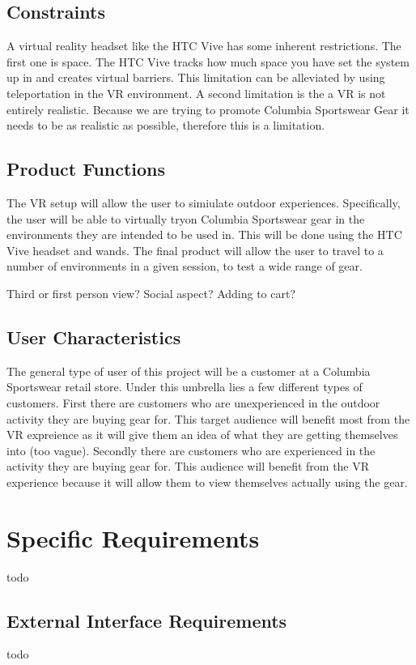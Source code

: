 \documentclass[10pt, oneside,onecolumn,draftclsnofoot]{IEEEtran}
\begin{document}
\subsection{Constraints}
A virtual reality headset like the HTC Vive has some inherent restrictions.
The first one is space. The HTC Vive tracks how much space you have set the
system up in and creates virtual barriers. This limitation can be alleviated by
using teleportation in the VR environment. A second limitation is the a
VR is not entirely realistic. Because we are trying to promote Columbia Sportswear
Gear it needs to be as realistic as possible, therefore this is a limitation.

\subsection{Product Functions}
The VR setup will allow the user to simiulate outdoor experiences.
Specifically, the user will be able to virtually tryon Columbia Sportswear
gear in the environments they are intended to be used in.
This will be done using the HTC Vive headset and wands. The final product
will allow the user to travel to a number of environments in a given session,
to test a wide range of gear.

Third or first person view?
Social aspect? Adding to cart?
\subsection{User Characteristics}
The general type of user of this project will be a customer at a Columbia
Sportswear retail store. Under this umbrella lies a few different types of
customers. First there are customers who are unexperienced in the outdoor
activity they are buying gear for. This target audience will benefit most
from the VR expreience as it will give them an idea of what they
are getting themselves into (too vague). Secondly there are customers who are
experienced in the activity they are buying gear for. This audience will
benefit from the VR experience because it will allow them to view themselves
actually using the gear.

\section{Specific Requirements}
todo
\subsection{External Interface Requirements}
todo
\end{document}

